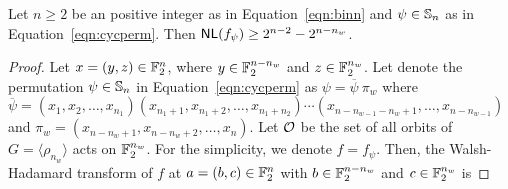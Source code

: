 \documentclass{llncs}
\begin{document}
\iffalse
\begin{theorem}\label{thm:nlpsi}
Let $n \geq 2$ be an positive integer as in Equation~\ref{eqn:binn} and $\psi \in \mathbb{S}_n$ as in Equation~\ref{eqn:cycperm}.
Then $\mathsf{NL}(f_\psi) \ge 2^{n-2} - 2^{n-n_w}$.
\end{theorem}
\begin{proof}
Let $x = (y,z) \in \mathbb{F}_2^n$, where $y\in \mathbb{F}_2^{n-n_w}$ and $z \in \mathbb{F}_2^{n_w}$. Let denote 
the permutation $\psi \in \mathbb{S}_n$ in Equation~\ref{eqn:cycperm} as $\psi = \overline{\psi}~\pi_w$ where $\overline{\psi}  = (x_1, x_2, \ldots, x_{n_1}) (x_{n_1+1}, x_{n_1+2}, \ldots, x_{n_1+n_2})\cdots (x_{n-n_{w-1}-n_w+1}, \ldots, x_{n-n_{w-1}})$ and $\pi_w = (x_{n-n_w+1}, x_{n-n_w+2}, \ldots, x_n)$.
Let $\mathcal{O}$ be the set of all orbits of $G = \langle \rho_{n_w} \rangle$ acts on $\mathbb{F}_2^{n_w}$.
For the simplicity, we denote $f = f_\psi$.
Then, the Walsh-Hadamard transform of $f$ at $a = (b,c) \in \mathbb{F}_2^n$ with $b \in \mathbb{F}_2^{n-n_w}$ and $c \in \mathbb{F}_2^{n_w}$ is


\end{proof}
\end{document}
